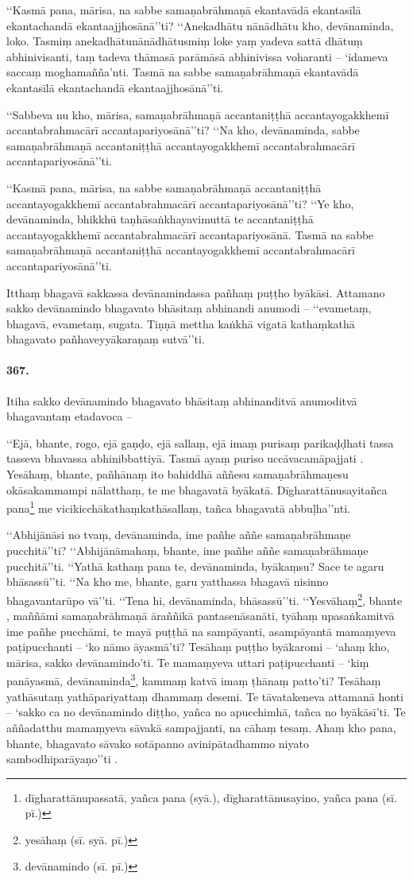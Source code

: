 ‘‘Kasmā pana, mārisa, na sabbe samaṇabrāhmaṇā ekantavādā ekantasīlā ekantachandā ekantaajjhosānā’’ti? ‘‘Anekadhātu nānādhātu kho, devānaminda, loko. Tasmiṃ anekadhātunānādhātusmiṃ loke yaṃ yadeva sattā dhātuṃ abhinivisanti, taṃ tadeva thāmasā parāmāsā abhinivissa voharanti – ‘idameva saccaṃ moghamañña’nti. Tasmā na sabbe samaṇabrāhmaṇā ekantavādā ekantasīlā ekantachandā ekantaajjhosānā’’ti.

‘‘Sabbeva nu kho, mārisa, samaṇabrāhmaṇā accantaniṭṭhā accantayogakkhemī accantabrahmacārī accantapariyosānā’’ti? ‘‘Na kho, devānaminda, sabbe samaṇabrāhmaṇā accantaniṭṭhā accantayogakkhemī accantabrahmacārī accantapariyosānā’’ti.

‘‘Kasmā pana, mārisa, na sabbe samaṇabrāhmaṇā accantaniṭṭhā accantayogakkhemī accantabrahmacārī accantapariyosānā’’ti? ‘‘Ye kho, devānaminda, bhikkhū taṇhāsaṅkhayavimuttā te accantaniṭṭhā accantayogakkhemī accantabrahmacārī accantapariyosānā. Tasmā na sabbe samaṇabrāhmaṇā accantaniṭṭhā accantayogakkhemī accantabrahmacārī accantapariyosānā’’ti.

Itthaṃ bhagavā sakkassa devānamindassa pañhaṃ puṭṭho byākāsi. Attamano sakko devānamindo bhagavato bhāsitaṃ abhinandi anumodi – ‘‘evametaṃ, bhagavā, evametaṃ, sugata. Tiṇṇā mettha kaṅkhā vigatā kathaṃkathā bhagavato pañhaveyyākaraṇaṃ sutvā’’ti.

\paragraph{367.} Itiha sakko devānamindo bhagavato bhāsitaṃ abhinanditvā anumoditvā bhagavantaṃ etadavoca –

‘‘Ejā, bhante, rogo, ejā gaṇḍo, ejā sallaṃ, ejā imaṃ purisaṃ parikaḍḍhati tassa tasseva bhavassa abhinibbattiyā. Tasmā ayaṃ puriso uccāvacamāpajjati . Yesāhaṃ, bhante, pañhānaṃ ito bahiddhā aññesu samaṇabrāhmaṇesu okāsakammampi nālatthaṃ, te me bhagavatā byākatā. Dīgharattānusayitañca pana\footnote{dīgharattānupassatā, yañca pana (syā.), dīgharattānusayino, yañca pana (sī. pī.)} me vicikicchākathaṃkathāsallaṃ, tañca bhagavatā abbuḷha’’nti.

‘‘Abhijānāsi no tvaṃ, devānaminda, ime pañhe aññe samaṇabrāhmaṇe pucchitā’’ti? ‘‘Abhijānāmahaṃ, bhante, ime pañhe aññe samaṇabrāhmaṇe pucchitā’’ti. ‘‘Yathā kathaṃ pana te, devānaminda, byākaṃsu? Sace te agaru bhāsassū’’ti. ‘‘Na kho me, bhante, garu yatthassa bhagavā nisinno bhagavantarūpo vā’’ti. ‘‘Tena hi, devānaminda, bhāsassū’’ti. ‘‘Yesvāhaṃ\footnote{yesāhaṃ (sī. syā. pī.)}, bhante , maññāmi samaṇabrāhmaṇā āraññikā pantasenāsanāti, tyāhaṃ upasaṅkamitvā ime pañhe pucchāmi, te mayā puṭṭhā na sampāyanti, asampāyantā mamaṃyeva paṭipucchanti – ‘ko nāmo āyasmā’ti? Tesāhaṃ puṭṭho byākaromi – ‘ahaṃ kho, mārisa, sakko devānamindo’ti. Te mamaṃyeva uttari paṭipucchanti – ‘kiṃ panāyasmā, devānaminda\footnote{devānamindo (sī. pī.)}, kammaṃ katvā imaṃ ṭhānaṃ patto’ti? Tesāhaṃ yathāsutaṃ yathāpariyattaṃ dhammaṃ desemi. Te tāvatakeneva attamanā honti – ‘sakko ca no devānamindo diṭṭho, yañca no apucchimhā, tañca no byākāsī’ti. Te aññadatthu mamaṃyeva sāvakā sampajjanti, na cāhaṃ tesaṃ. Ahaṃ kho pana, bhante, bhagavato sāvako sotāpanno avinipātadhammo niyato sambodhiparāyaṇo’’ti .


